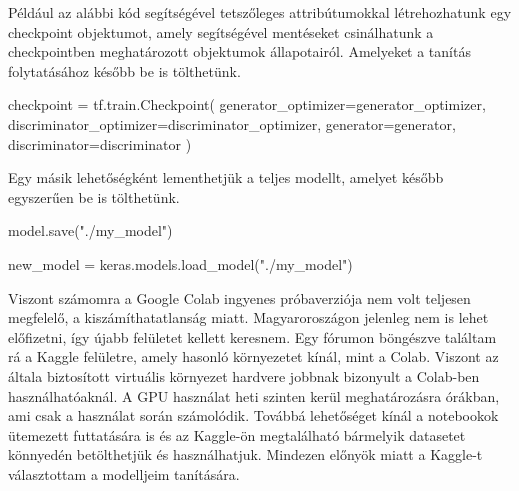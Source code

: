 Például az alábbi kód segítségével tetszőleges attribútumokkal létrehozhatunk egy checkpoint objektumot, amely segítségével mentéseket csinálhatunk a checkpointben meghatározott objektumok állapotairól. Amelyeket a tanítás folytatásához később be is tölthetünk.
\begin{python}
checkpoint = tf.train.Checkpoint(
    generator_optimizer=generator_optimizer,
    discriminator_optimizer=discriminator_optimizer,
    generator=generator,
    discriminator=discriminator
)
\end{python}

Egy másik lehetőségként lementhetjük a teljes modellt, amelyet később egyszerűen be is tölthetünk.
\begin{python}
model.save("./my_model")

new_model = keras.models.load_model("./my_model")
\end{python}
Viszont számomra a Google Colab ingyenes próbaverziója nem volt teljesen megfelelő, a kiszámíthatatlanság miatt. Magyaroroszágon jelenleg nem is lehet előfizetni, így újabb felületet kellett keresnem. Egy fórumon böngészve találtam rá a Kaggle felületre, amely hasonló környezetet kínál, mint a Colab. Viszont az általa biztosított virtuális környezet hardvere jobbnak bizonyult a Colab-ben használhatóaknál. A GPU használat heti szinten kerül meghatározásra órákban, ami csak a használat során számolódik. Továbbá lehetőséget kínál a notebookok ütemezett futtatására is és az Kaggle-ön megtalálható bármelyik datasetet könnyedén betölthetjük és használhatjuk. Mindezen előnyök miatt a Kaggle-t választottam a modelljeim tanítására.


